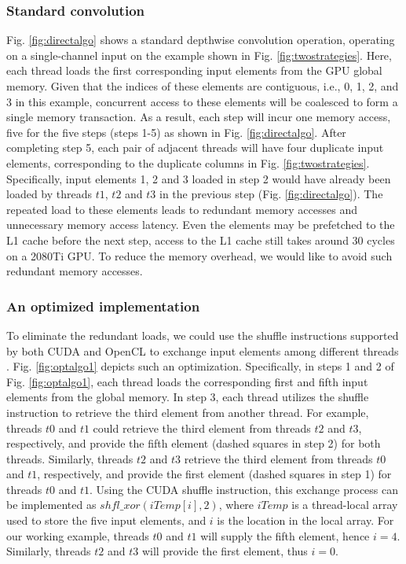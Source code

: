 \subsubsection{Standard convolution} Fig. \ref{fig:directalgo} shows a standard depthwise convolution operation, operating on a single-channel input on the example shown in Fig. \ref{fig:twostrategies}.
Here, each thread loads the first corresponding input elements from the GPU global memory. Given that the indices of these elements are
contiguous, i.e., 0, 1, 2, and 3 in this example, concurrent access to these elements will be coalesced to form a single memory
transaction. As a result, each step will incur one memory access, five for the five steps (steps 1-5) as shown in Fig.
\ref{fig:directalgo}. After completing step 5, each pair of adjacent threads will have four duplicate input elements, corresponding to the
duplicate columns in Fig. \ref{fig:twostrategies}. Specifically, input elements 1, 2 and 3 loaded in step 2 would have already been
loaded by threads $t1$, $t2$ and $t3$ in the previous step (Fig. \ref{fig:directalgo}). The repeated load to these elements leads to
redundant memory accesses and unnecessary memory access latency. Even the elements may be prefetched to the L1 cache before the next step,
access to the L1 cache still takes around 30 cycles on a 2080Ti GPU. To reduce the memory overhead, we would like to avoid such redundant
memory accesses.

\subsubsection{An optimized implementation} To eliminate the redundant loads, we could use the shuffle instructions supported by both CUDA and OpenCL to exchange input elements among
different threads {\color{red}\cite{lu2020optimizing}}. Fig. \ref{fig:optalgo1} depicts such an optimization. Specifically, in steps 1 and 2 of Fig. \ref{fig:optalgo1},
each thread loads the corresponding first and fifth input elements from the global memory. In step 3, each thread utilizes the shuffle
instruction to retrieve the third element from another thread. For example, threads $t0$ and $t1$ could retrieve the third element from
threads $t2$ and $t3$, respectively, and provide the fifth element (dashed squares in step 2) for both threads. Similarly, threads $t2$ and
$t3$ retrieve the third element from threads $t0$ and $t1$, respectively, and provide the first element (dashed squares in step 1) for
threads $t0$ and $t1$. Using the CUDA shuffle instruction, this exchange process can be implemented as $shfl\_xor(iTemp[i],2)$, where
$iTemp$ is a thread-local array used to store the five input elements, and $i$ is the location in the local array. For our working example,
threads $t0$ and $t1$ will supply the fifth element, hence $i=4$. Similarly, threads $t2$ and $t3$ will provide the first element, thus
$i=0$.

